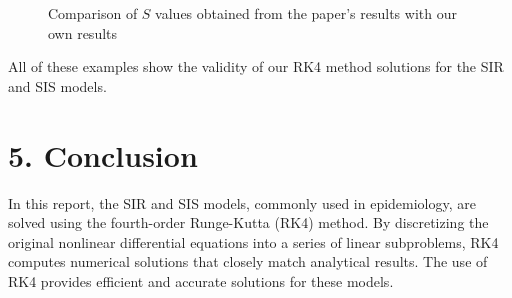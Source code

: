 \documentclass[10pt]{article}
\begin{document}
\begin{figure}[!htbp]
  \centering
  \hfill
  \caption{Comparison of \(S\) values obtained from the paper's results with our own results  }
\end{figure}
\newpage
All of these examples show the validity of our RK4 method solutions for the SIR and SIS models.

\section*{5. Conclusion}
In this report, the SIR and SIS models, commonly used in epidemiology, are solved using the fourth-order Runge-Kutta (RK4) method. By discretizing the original nonlinear differential equations into a series of linear subproblems, RK4 computes numerical solutions that closely match analytical results. The use of RK4 provides efficient and accurate solutions for these models.
\end{document}
